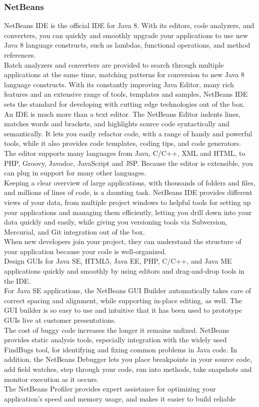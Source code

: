 \documentclass[12pt,a4paper]{article}
\newcommand\tab[1][.7cm]{\hspace*{#1}}
\begin{document}
		\subsubsection{NetBeans}
		\tab NetBeans \cite{Ref:18} IDE is the official IDE for Java 8. With its editors, code analyzers, and converters, you can quickly and smoothly upgrade your applications to use new Java 8 language constructs, such as lambdas, functional operations, and method references.\\Batch analyzers and converters are provided to search through multiple applications at the same time, matching patterns for conversion to new Java 8 language constructs.
With its constantly improving Java Editor, many rich features and an extensive range of tools, templates and samples, NetBeans IDE sets the standard for developing with cutting edge technologies out of the box.\\An IDE is much more than a text editor. The NetBeans Editor indents lines, matches words and brackets, and highlights source code syntactically and semantically. It lets you easily refactor code, with a range of handy and powerful tools, while it also provides code templates, coding tips, and code generators.\\The editor supports many languages from Java, C/C++, XML and HTML, to PHP, Groovy, Javadoc, JavaScript and JSP. Because the editor is extensible, you can plug in support for many other languages.\\Keeping a clear overview of large applications, with thousands of folders and files, and millions of lines of code, is a daunting task. NetBeans IDE provides different views of your data, from multiple project windows to helpful tools for setting up your applications and managing them efficiently, letting you drill down into your data quickly and easily, while giving you versioning tools via Subversion, Mercurial, and Git integration out of the box.\\When new developers join your project, they can understand the structure of your application because your code is well-organized.\\Design GUIs for Java SE, HTML5, Java EE, PHP, C/C++, and Java ME applications quickly and smoothly by using editors and drag-and-drop tools in the IDE.\\For Java SE applications, the NetBeans GUI Builder automatically takes care of correct spacing and alignment, while supporting in-place editing, as well. The GUI builder is so easy to use and intuitive that it has been used to prototype GUIs live at customer presentations.\\The cost of buggy code increases the longer it remains unfixed. NetBeans provides static analysis tools, especially integration with the widely used FindBugs tool, for identifying and fixing common problems in Java code. In addition, the NetBeans Debugger lets you place breakpoints in your source code, add field watches, step through your code, run into methods, take snapshots and monitor execution as it occurs.\\The NetBeans Profiler provides expert assistance for optimizing your application's speed and memory usage, and makes it easier to build reliable 
\end{document}
